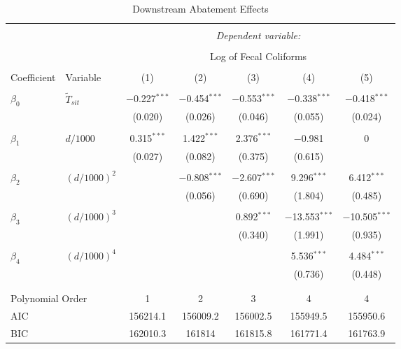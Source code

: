 \documentclass[12pt]{article}
\begin{document}
\begin{table}[t!] \centering 
  \caption{Downstream Abatement Effects }
  \label{tab:downstream} 
\begin{tabular}{@{\extracolsep{5pt}}llccccc} 
\\[-1.8ex]\hline 
\hline \\[-1.8ex] 
 & & \multicolumn{5}{c}{\textit{Dependent variable:}} \\ 
\cline{3-7} 
\\[-1.8ex] & & \multicolumn{5}{c}{Log of Fecal Coliforms} \\ 
\\[-1.8ex] 
\small{Coefficient} & \small{Variable} & (1) & (2) & (3) & (4) & (5)\\ 
\hline \\[-1.8ex] 
 $\beta_0$ & $\widetilde{T}_{sit}$ & $-$0.227$^{***}$ & $-$0.454$^{***}$ & $-$0.553$^{***}$ & $-$0.338$^{***}$ & $-$0.418$^{***}$ \\ 
&  & (0.020) & (0.026) & (0.046) & (0.055) & (0.024) \\ 
 & & & & & & \\ 
 $\beta_1$ & $d/ 1000$ & 0.315$^{***}$ & 1.422$^{***}$ & 2.376$^{***}$ & $-$0.981 & 0 \\ 
&  & (0.027) & (0.082) & (0.375) & (0.615) &  \\ 
&  & & & & & \\ 
 $\beta_2$ & $(d/ 1000)^2$ &  & $-$0.808$^{***}$ & $-$2.607$^{***}$ & 9.296$^{***}$ & 6.412$^{***}$ \\ 
&  &  & (0.056) & (0.690) & (1.804) & (0.485) \\ 
 & & & & & & \\ 
 $\beta_3$ & $(d/ 1000)^3$ &  &  & 0.892$^{***}$ & $-$13.553$^{***}$ & $-$10.505$^{***}$ \\ 
&  &  &  & (0.340) & (1.991) & (0.935) \\ 
  & & & & & & \\ 
 $\beta_4$ & $(d/ 1000)^4$ & &  &  & 5.536$^{***}$ & 4.484$^{***}$ \\ 
&  &  &  &  & (0.736) & (0.448) \\ 
 & & & & & & \\ 
\hline \\[-1.8ex] 
\multicolumn{2}{l}{Polynomial Order}  & 1 & 2 & 3 & 4 & 4 \\ 
\multicolumn{2}{l}{AIC}  & 156214.1 & 156009.2 & 156002.5 & 155949.5 & 155950.6 \\ 
\multicolumn{2}{l}{BIC}  & 162010.3 & 161814 & 161815.8 & 161771.4 & 161763.9 \\ 

\end{tabular}
\end{table}
\end{document}
